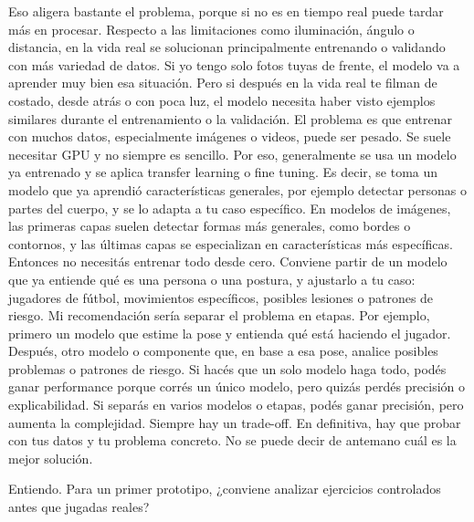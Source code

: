 \begin{description}[leftmargin=0pt, itemindent=\parindent, labelsep=0.5em, itemsep=0pt, parsep=0pt, topsep=0pt]
    \item[\textbf{Gonzalo Pereyra Metnyk:}] Eso aligera bastante el problema, porque si no es en tiempo real puede tardar más en procesar. Respecto a las limitaciones como iluminación, ángulo o distancia, en la vida real se solucionan principalmente entrenando o validando con más variedad de datos. Si yo tengo solo fotos tuyas de frente, el modelo va a aprender muy bien esa situación. Pero si después en la vida real te filman de costado, desde atrás o con poca luz, el modelo necesita haber visto ejemplos similares durante el entrenamiento o la validación. El problema es que entrenar con muchos datos, especialmente imágenes o videos, puede ser pesado. Se suele necesitar GPU y no siempre es sencillo. Por eso, generalmente se usa un modelo ya entrenado y se aplica transfer learning o fine tuning. Es decir, se toma un modelo que ya aprendió características generales, por ejemplo detectar personas o partes del cuerpo, y se lo adapta a tu caso específico. En modelos de imágenes, las primeras capas suelen detectar formas más generales, como bordes o contornos, y las últimas capas se especializan en características más específicas. Entonces no necesitás entrenar todo desde cero. Conviene partir de un modelo que ya entiende qué es una persona o una postura, y ajustarlo a tu caso: jugadores de fútbol, movimientos específicos, posibles lesiones o patrones de riesgo. Mi recomendación sería separar el problema en etapas. Por ejemplo, primero un modelo que estime la pose y entienda qué está haciendo el jugador. Después, otro modelo o componente que, en base a esa pose, analice posibles problemas o patrones de riesgo. Si hacés que un solo modelo haga todo, podés ganar performance porque corrés un único modelo, pero quizás perdés precisión o explicabilidad. Si separás en varios modelos o etapas, podés ganar precisión, pero aumenta la complejidad. Siempre hay un trade-off. En definitiva, hay que probar con tus datos y tu problema concreto. No se puede decir de antemano cuál es la mejor solución.

    \item[\textbf{Entrevistador:}] Entiendo. Para un primer prototipo, ¿conviene analizar ejercicios controlados antes que jugadas reales?


\end{description}

